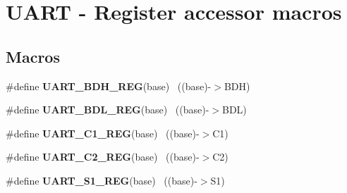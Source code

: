 \hypertarget{group___u_a_r_t___register___accessor___macros}{}\section{U\+A\+R\+T -\/ Register accessor macros}
\label{group___u_a_r_t___register___accessor___macros}
\subsection*{Macros}
\begin{DoxyCompactItemize}
\item 
\hypertarget{group___u_a_r_t___register___accessor___macros_ga3cad0e41deb6b429abe066c0ef976e27}{}\#define {\bfseries U\+A\+R\+T\+\_\+\+B\+D\+H\+\_\+\+R\+E\+G}(base)                                          ~((base)-\/$>$B\+D\+H)\label{group___u_a_r_t___register___accessor___macros_ga3cad0e41deb6b429abe066c0ef976e27}

\item 
\hypertarget{group___u_a_r_t___register___accessor___macros_ga5a5b3d9a31233e9411d5faf9f75cef37}{}\#define {\bfseries U\+A\+R\+T\+\_\+\+B\+D\+L\+\_\+\+R\+E\+G}(base)                                          ~((base)-\/$>$B\+D\+L)\label{group___u_a_r_t___register___accessor___macros_ga5a5b3d9a31233e9411d5faf9f75cef37}

\item 
\hypertarget{group___u_a_r_t___register___accessor___macros_gaf1364840dbdc70f6ca2931518a3f0c04}{}\#define {\bfseries U\+A\+R\+T\+\_\+\+C1\+\_\+\+R\+E\+G}(base)                                            ~((base)-\/$>$C1)\label{group___u_a_r_t___register___accessor___macros_gaf1364840dbdc70f6ca2931518a3f0c04}

\item 
\hypertarget{group___u_a_r_t___register___accessor___macros_ga09dd2d71c0fb360ed55f2ef2aca2cdcd}{}\#define {\bfseries U\+A\+R\+T\+\_\+\+C2\+\_\+\+R\+E\+G}(base)                                            ~((base)-\/$>$C2)\label{group___u_a_r_t___register___accessor___macros_ga09dd2d71c0fb360ed55f2ef2aca2cdcd}

\item 
\hypertarget{group___u_a_r_t___register___accessor___macros_gae94e819cfe08eebd802bc5d3c2bd4c05}{}\#define {\bfseries U\+A\+R\+T\+\_\+\+S1\+\_\+\+R\+E\+G}(base)                                            ~((base)-\/$>$S1)\label{group___u_a_r_t___register___accessor___macros_gae94e819cfe08eebd802bc5d3c2bd4c05}


\end{DoxyCompactItemize}
